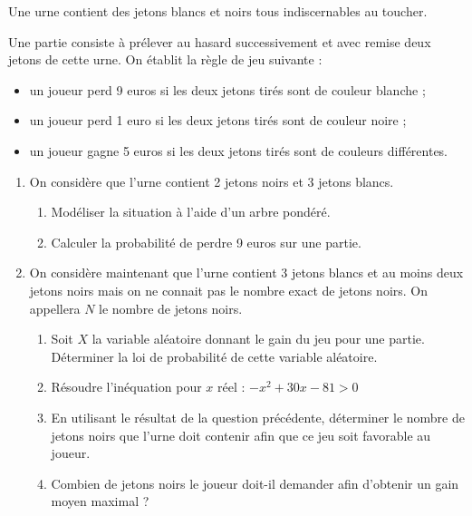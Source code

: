 \documentclass[11pt,fleqn, openany]{book} %
\begin{document}
\begin{exercise}[topic=prob03, subtitle={(Centres étrangers 2022)}]
Une urne contient des jetons blancs et noirs tous indiscernables au toucher.

Une partie consiste à prélever au hasard successivement et avec remise deux jetons de cette urne. On établit la règle de jeu suivante :
\begin{itemize}
\item un joueur perd 9 euros si les deux jetons tirés sont de couleur blanche ;
\item un joueur perd 1 euro si les deux jetons tirés sont de couleur noire ;
\item un joueur gagne 5 euros si les deux jetons tirés sont de couleurs différentes.
\end{itemize}

\begin{enumerate} 
\item On considère que l'urne contient 2 jetons noirs et 3 jetons blancs.
 \begin{enumerate}
\item Modéliser la situation à l'aide d'un arbre pondéré.
\item Calculer la probabilité de perdre 9 euros sur une partie.\end{enumerate}
\item On considère maintenant que l'urne contient 3 jetons blancs et au moins deux jetons noirs
mais on ne connait pas le nombre exact de jetons noirs. On appellera $N$ le nombre de jetons
noirs.
\begin{enumerate} \item Soit $X$ la variable aléatoire donnant le gain du jeu pour une partie.
Déterminer la loi de probabilité de cette variable aléatoire.
\item Résoudre l'inéquation pour $x$ réel : $-x^2+30x-81>0$
\item En utilisant le résultat de la question précédente, déterminer le nombre de jetons noirs
que l'urne doit contenir afin que ce jeu soit favorable au joueur.
\item Combien de jetons noirs le joueur doit-il demander afin d'obtenir un gain moyen maximal ?\end{enumerate}\end{enumerate}\end{exercise}
\end{document}
